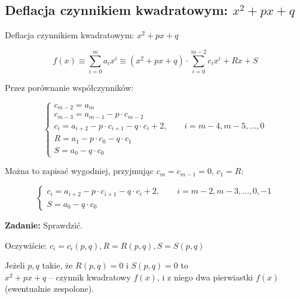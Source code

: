 \subsection{Deflacja czynnikiem kwadratowym: $ x^2 +px + q $}

\begin{frame}{Deflacja czynnikiem kwadratowym: $ x^2 +px + q $}
  \begin{block}{}
    $$ f(x) \equiv \sum_{i=0}^m a_i x^i \equiv (x^2 + px + q) \cdot \sum_{i=0}^{m-2} c_i x^i + Rx +S $$
  \end{block}

  Przez porównanie współczynników:

  $$ \left \{ \begin{array}{l}
  c_{m-2} = a_m \\
  c_{m-3} = a_{m-1} - p \cdot c_{m-2} \\
  c_i = a_{i+2} - p \cdot c_{i+1} - q \cdot c_i + 2, \qquad i = m - 4, m - 5, \dots , 0 \\ %
  R = a_1 - p \cdot c_0 - q \cdot c_1 \\
  S = a_0 - q \cdot c_0
  \end{array} \right. $$
\end{frame}

\begin{frame}
  Można to zapisać wygodniej, przyjmując $ c_m = c_{m-1} = 0 $, $ c_1 = R $:

  \begin{block}{}
    $$ \left \{ \begin{array}{l}
    c_i = a_{i+2} - p \cdot c_{i+1} - q \cdot c_i + 2, \qquad i = m-2, m-3, \dots , 0, -1 \\
    S = a_0 - q \cdot c_0
    \end{array} \right. $$
  \end{block}

  \textbf{Zadanie:} Sprawdzić.

  \vspace{5px}

  Oczywiście: $ c_i = c_i(p,q), R = R(p,q), S = S(p,q) $

  \vspace{5px}

  Jeżeli $p,q$ takie, że $R(p,q) = 0$ i $S(p,q) = 0$ to \\ $x^2 + px + q$ -- czynnik kwadratowy $f(x)$, i z niego dwa pierwiastki $f(x)$ (ewentualnie zespolone).
\end{frame}
